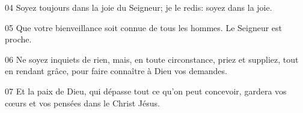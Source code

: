 
04 Soyez toujours dans la joie du Seigneur; je le redis: soyez dans la joie.

05 Que votre bienveillance soit connue de tous les hommes. Le Seigneur est proche.

06 Ne soyez inquiets de rien, mais, en toute circonstance, priez et suppliez, tout en rendant grâce, pour faire connaître à Dieu vos demandes.

07 Et la paix de Dieu, qui dépasse tout ce qu’on peut concevoir, gardera vos cœurs et vos pensées dans le Christ Jésus.
